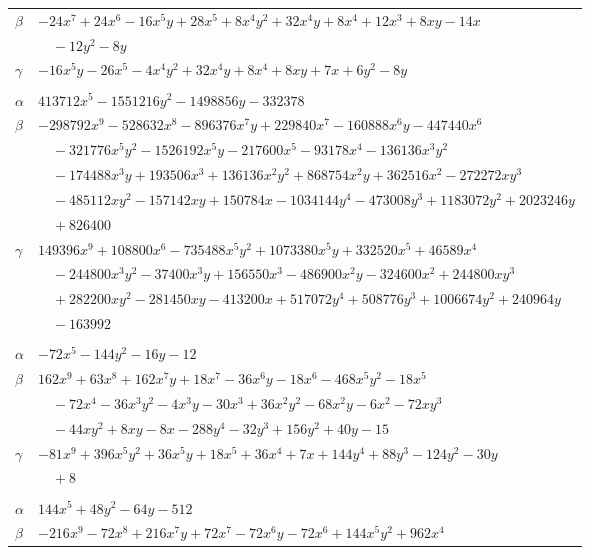 \documentclass[11pt]{article}
\begin{document}
\begin{longtable}{@{}ll@{}}
$\beta$ & $-24x^{7}+24x^{6}-16x^{5}y+28x^{5}+8x^{4}y^{2}+32x^{4}y+8x^{4}+12x^{3}+8xy-14x$\\
 & $\quad -12y^{2}-8y$\\
$\gamma$ & $-16x^{5}y-26x^{5}-4x^{4}y^{2}+32x^{4}y+8x^{4}+8xy+7x+6y^{2}-8y$\\
\addlinespace[3pt]
\multicolumn{2}{@{}l}{$\{i,j\}=\{16,29\}$, $k_{ij}=2\cdot 13^{3}$}\\
$\alpha$ & $413712x^{5}-1551216y^{2}-1498856y-332378$\\
$\beta$ & $-298792x^{9}-528632x^{8}-896376x^{7}y+229840x^{7}-160888x^{6}y-447440x^{6}$\\
 & $\quad -321776x^{5}y^{2}-1526192x^{5}y-217600x^{5}-93178x^{4}-136136x^{3}y^{2}$\\
 & $\quad -174488x^{3}y+193506x^{3}+136136x^{2}y^{2}+868754x^{2}y+362516x^{2}-272272xy^{3}$\\
 & $\quad -485112xy^{2}-157142xy+150784x-1034144y^{4}-473008y^{3}+1183072y^{2}+2023246y$\\
 & $\quad +826400$\\
$\gamma$ & $149396x^{9}+108800x^{6}-735488x^{5}y^{2}+1073380x^{5}y+332520x^{5}+46589x^{4}$\\
 & $\quad -244800x^{3}y^{2}-37400x^{3}y+156550x^{3}-486900x^{2}y-324600x^{2}+244800xy^{3}$\\
 & $\quad +282200xy^{2}-281450xy-413200x+517072y^{4}+508776y^{3}+1006674y^{2}+240964y$\\
 & $\quad -163992$\\
\addlinespace[3pt]
\multicolumn{2}{@{}l}{$\{i,j\}=\{16,39\}$, $k_{ij}=2^{2}\cdot 5$}\\
$\alpha$ & $-72x^{5}-144y^{2}-16y-12$\\
$\beta$ & $162x^{9}+63x^{8}+162x^{7}y+18x^{7}-36x^{6}y-18x^{6}-468x^{5}y^{2}-18x^{5}$\\
 & $\quad -72x^{4}-36x^{3}y^{2}-4x^{3}y-30x^{3}+36x^{2}y^{2}-68x^{2}y-6x^{2}-72xy^{3}$\\
 & $\quad -44xy^{2}+8xy-8x-288y^{4}-32y^{3}+156y^{2}+40y-15$\\
$\gamma$ & $-81x^{9}+396x^{5}y^{2}+36x^{5}y+18x^{5}+36x^{4}+7x+144y^{4}+88y^{3}-124y^{2}-30y$\\
 & $\quad +8$\\
\addlinespace[3pt]
\multicolumn{2}{@{}l}{$\{i,j\}=\{17,25\}$, $k_{ij}=2^{9}$}\\
$\alpha$ & $144x^{5}+48y^{2}-64y-512$\\
$\beta$ & $-216x^{9}-72x^{8}+216x^{7}y+72x^{7}-72x^{6}y-72x^{6}+144x^{5}y^{2}+962x^{4}$\\

\end{longtable}
\end{document}
